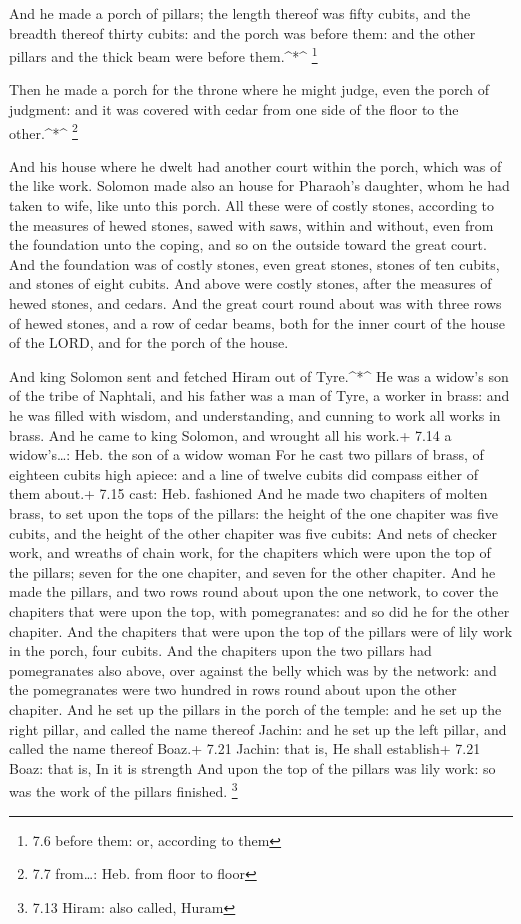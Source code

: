  And he made a porch of pillars; the length thereof was
fifty cubits, and the breadth thereof thirty cubits: and the porch was
before them: and the other pillars and the thick beam were before
them.\^{}*\^{} \footnote{7.6 before them: or, according to them}

 Then he made a porch for the throne where he might judge,
even the porch of judgment: and it was covered with cedar from one side
of the floor to the other.\^{}*\^{} \footnote{7.7 from\ldots: Heb. from
  floor to floor}

 And his house where he dwelt had another court within the
porch, which was of the like work. Solomon made also an house for
Pharaoh's daughter, whom he had taken to wife, like unto this porch.
 All these were of costly stones, according to the measures
of hewed stones, sawed with saws, within and without, even from the
foundation unto the coping, and so on the outside toward the great
court.  And the foundation was of costly stones, even great
stones, stones of ten cubits, and stones of eight cubits. 
And above were costly stones, after the measures of hewed stones, and
cedars.  And the great court round about was with three
rows of hewed stones, and a row of cedar beams, both for the inner court
of the house of the LORD, and for the porch of the house.

 And king Solomon sent and fetched Hiram out of
Tyre.\^{}*\^{}  He was a widow's son of the tribe of
Naphtali, and his father was a man of Tyre, a worker in brass: and he
was filled with wisdom, and understanding, and cunning to work all works
in brass. And he came to king Solomon, and wrought all his work.+ 7.14 a
widow's\ldots: Heb. the son of a widow woman  For he cast
two pillars of brass, of eighteen cubits high apiece: and a line of
twelve cubits did compass either of them about.+ 7.15 cast: Heb.
fashioned  And he made two chapiters of molten brass, to
set upon the tops of the pillars: the height of the one chapiter was
five cubits, and the height of the other chapiter was five cubits:
 And nets of checker work, and wreaths of chain work, for
the chapiters which were upon the top of the pillars; seven for the one
chapiter, and seven for the other chapiter.  And he made
the pillars, and two rows round about upon the one network, to cover the
chapiters that were upon the top, with pomegranates: and so did he for
the other chapiter.  And the chapiters that were upon the
top of the pillars were of lily work in the porch, four cubits.
 And the chapiters upon the two pillars had pomegranates
also above, over against the belly which was by the network: and the
pomegranates were two hundred in rows round about upon the other
chapiter.  And he set up the pillars in the porch of the
temple: and he set up the right pillar, and called the name thereof
Jachin: and he set up the left pillar, and called the name thereof
Boaz.+ 7.21 Jachin: that is, He shall establish+ 7.21 Boaz: that is, In
it is strength  And upon the top of the pillars was lily
work: so was the work of the pillars finished. \footnote{7.13 Hiram:
  also called, Huram}

